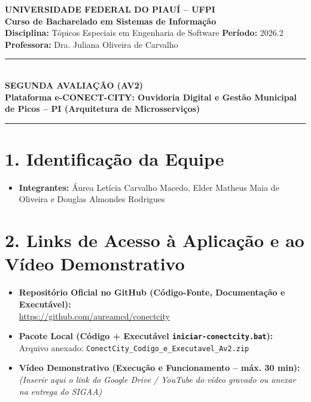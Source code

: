 \documentclass[12pt,a4paper]{article}
\begin{document}
\begin{center}
    {\Large \textbf{UNIVERSIDADE FEDERAL DO PIAUÍ -- UFPI}}\\[4pt]
    {\large \textbf{Curso de Bacharelado em Sistemas de Informação}}\\[4pt]
    {\normalsize \textbf{Disciplina:} Tópicos Especiais em Engenharia de Software \quad \textbf{Período:} 2026.2}\\[2pt]
    {\normalsize \textbf{Professora:} Dra. Juliana Oliveira de Carvalho}\\[14pt]
    \rule{\textwidth}{1.2pt}\\[10pt]
    {\LARGE \textbf{\textcolor{ufpiblue}{SEGUNDA AVALIAÇÃO (AV2)}}}\\[6pt]
    {\large \textbf{Plataforma e-CONECT-CITY: Ouvidoria Digital e Gestão Municipal de Picos -- PI (Arquitetura de Microsserviços)}}\\[6pt]
    \rule{\textwidth}{1.2pt}
\end{center}

\vspace{8pt}

\section*{1. Identificação da Equipe}
\begin{itemize}[leftmargin=1.5em]
    \item \textbf{Integrantes:} Áurea Letícia Carvalho Macedo, Elder Matheus Maia de Oliveira e Douglas Almondes Rodrigues
\end{itemize}

\section*{2. Links de Acesso à Aplicação e ao Vídeo Demonstrativo}
\begin{itemize}[leftmargin=1.5em]
    \item \textbf{Repositório Oficial no GitHub (Código-Fonte, Documentação e Executável):}\\
    \url{https://github.com/aureamcd/conectcity}
    \item \textbf{Pacote Local (Código + Executável \texttt{iniciar-conectcity.bat}):}\\
    Arquivo anexado: \texttt{ConectCity\_Codigo\_e\_Executavel\_Av2.zip}
    \item \textbf{Vídeo Demonstrativo (Execução e Funcionamento -- máx. 30 min):}\\
    \textit{(Inserir aqui o link do Google Drive / YouTube do vídeo gravado ou anexar na entrega do SIGAA)}
\end{itemize}
\end{document}

